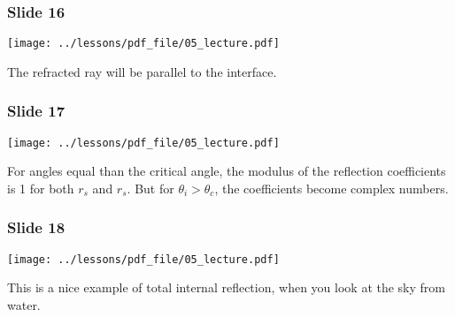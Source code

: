 \documentclass[../main/main.tex]{subfiles}
\begin{document}
\subsubsection*{Slide 16}

\begin{minipage}[]{0.5\linewidth}
\centering
\texttt{[image: ../lessons/pdf\_file/05\_lecture.pdf]}
\end{minipage}
\hspace{0.3cm}\vspace{0.3cm}
\begin{minipage}[c]{0.47\linewidth}

The refracted ray will be parallel to the interface.

\end{minipage}

\subsubsection*{Slide 17}

\begin{minipage}[]{0.5\linewidth}
\centering
\texttt{[image: ../lessons/pdf\_file/05\_lecture.pdf]}
\end{minipage}
\hspace{0.3cm}\vspace{0.3cm}
\begin{minipage}[c]{0.47\linewidth}

For angles equal than the critical angle, the modulus of the reflection coefficients is 1 for both \( r_s \) and \( r_s \). But for \( \theta _i > \theta _c \), the coefficients become complex numbers.

\end{minipage}

\subsubsection*{Slide 18}

\begin{minipage}[]{0.5\linewidth}
\centering
\texttt{[image: ../lessons/pdf\_file/05\_lecture.pdf]}
\end{minipage}
\hspace{0.3cm}\vspace{0.3cm}
\begin{minipage}[c]{0.47\linewidth}

This is a nice example of total internal reflection, when you look at the sky from water.

\end{minipage}
\end{document}
